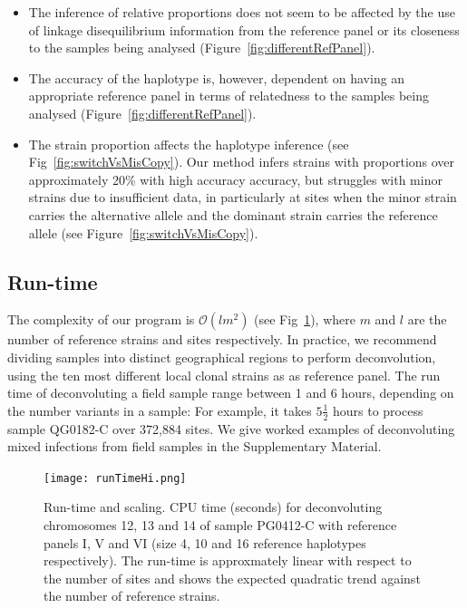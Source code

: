\documentclass{bioinfo}
\begin{document}
\begin{itemize}

\item The inference of relative proportions does not seem to be affected by the use of linkage disequilibrium information from the reference panel or its closeness to the samples being analysed (Figure~\ref{fig:differentRefPanel}).

\item The accuracy of the haplotype is, however, dependent on having an appropriate reference panel in terms of relatedness to the samples being analysed (Figure~\ref{fig:differentRefPanel}).

\item The strain proportion affects the haplotype inference (see Fig~\ref{fig:switchVsMisCopy}). Our method infers strains with proportions over approximately 20\% with high accuracy  accuracy, but struggles with minor strains due to insufficient data, in particularly at sites when the minor strain carries the alternative allele and the dominant strain carries the reference allele (see Figure~\ref{fig:switchVsMisCopy}).

\end{itemize}




\subsection{Run-time}

The complexity of our program is $\mathcal{O}(lm^2)$ (see Fig~\ref{fig:runtime}), where $m$ and $l$ are the number of reference strains and sites respectively. In practice, we recommend dividing samples into distinct geographical regions to perform deconvolution, using the ten most different local clonal strains as as reference panel. The run time of deconvoluting a field sample range between 1 and 6 hours, depending on the number variants in a sample: For example, it takes $5\frac{1}{2}$ hours to process sample {\textmd QG0182-C} over 372,884 sites.  We give worked examples of deconvoluting mixed infections from field samples in the Supplementary Material.



\begin{figure}[htb]
\centering
\texttt{[image: runTimeHi.png]}
\caption{Run-time and scaling.  CPU time (seconds) for deconvoluting chromosomes 12, 13 and 14 of sample {\textmd PG0412-C} with reference panels I, V and VI (size 4, 10 and 16 reference haplotypes respectively). The run-time is approxmately linear with respect to the number of sites and shows the expected quadratic trend against the number of reference strains.}\label{fig:runtime}
\end{figure}
\end{document}
